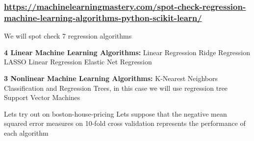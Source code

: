 \documentclass[11pt]{article}
\begin{document}
\subsubsection{\url{https://machinelearningmastery.com/spot-check-regression-machine-learning-algorithms-python-scikit-learn/}}
\label{sec:org17d44a4}
We will spot check 7 regression algorithms

\textbf{4 Linear Machine Learning Algorithms:}
Linear Regression
Ridge Regression
LASSO Linear Regression
Elastic Net Regression

\textbf{3 Nonlinear Machine Learning Algorithms:}
K-Nearest Neighbors
Classification and Regression Trees, in this case we will use regression tree
Support Vector Machines

Lets try out on boston-house-pricing
Lets suppose that the negative mean squared error measures on 10-fold cross validation represents the performance of each algorithm
\end{document}
